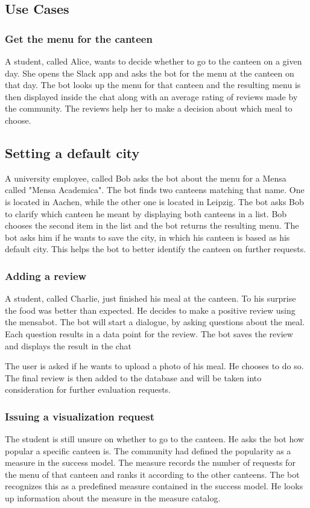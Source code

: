 \subsection{Use Cases}

\subsubsection{Get the menu for the canteen} A student, called Alice, wants to decide whether to go to the canteen on a given day. She opens the Slack app and asks the bot for the menu at the canteen on that day. The bot looks up the menu for that canteen and the resulting menu is then displayed inside the chat along with an average rating of reviews made by the community. The reviews help her to make a decision about which meal to choose.

\subsection{Setting a default city}
A university employee, called Bob asks the bot about the menu for a Mensa called "Mensa Academica". The bot finds two canteens matching that name. One is located in Aachen, while the other one is located in Leipzig. 
The bot asks Bob to clarify which canteen he meant by displaying both canteens in a list. Bob chooses the second item in the list and the bot returns the resulting menu.
The bot asks him if he wants to save the city, in which his canteen is based as his default city. This helps the bot to better identify the canteen on further requests.

\subsubsection{Adding a review} A student, called Charlie, just finished his meal at the canteen. To his surprise the food was better than expected. He decides to make a positive review using the mensabot. 
The bot will start a dialogue, by asking questions about the meal. Each question results in a data point for the review. The bot saves the review and displays the result in the chat

The user is asked if he wants to upload a photo of his meal. He chooses to do so. The final review is then added to the database and will be taken into consideration for further evaluation requests.


\subsubsection{Issuing a visualization request}
The student is still unsure on whether to go to the canteen. He asks the bot how popular a specific canteen is. The community had defined the popularity as a measure in the success model. The measure records the number of requests for the menu of that canteen and ranks it according to the other canteens.
The bot recognizes this as a predefined measure contained in the success model. He looks up information about the measure in the measure catalog. 

